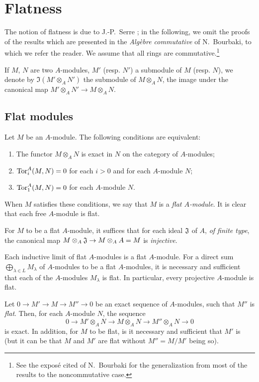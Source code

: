 \section{Flatness}
\label{section:0.6}

\begin{env}[6.0]
\label{0.6.0.0}
The notion of flatness is due to J.-P.~Serre \cite{I-16}; in the following, we omit the
proofs of the results which are presented in the \emph{Alg\`ebre commutative} of N.~Bourbaki,
to which we refer the reader. We assume that all rings are commutative.\footnote{See the
expos\'e cited of N.~Bourbaki for the generalization from most of the results to the
noncommutative case.}

If $M$, $N$ are two $A$-modules, $M'$ (resp. $N'$) a submodule of $M$ (resp. $N$), we denote
by $\Im(M'\otimes_A N')$ the submodule of $M\otimes_A N$, the image under the canonical map
$M'\otimes_A N'\to M\otimes_A N$.
\end{env}

\subsection{Flat modules}
\label{subsection:0.6.1}

\begin{env}[6.1.1]
\label{0.6.1.1}
Let $M$ be an $A$-module. The following conditions are equivalent:
\begin{enumerate}[label=(\alph*)]
  \item The functor $M\otimes_A N$ is exact in $N$ on the category of $A$-modules;
  \item ${\mathop{\mathrm{Tor}}\nolimits}_i^A(M,N)=0$ for each $i>0$ and for each $A$-module $N$;
  \item ${\mathop{\mathrm{Tor}}\nolimits}_1^A(M,N)=0$ for each $A$-module $N$.
\end{enumerate}

When $M$ satisfies these conditions, we say that $M$ is a
\emph{flat $A$-module}. It is clear that each free $A$-module is flat.

For $M$ to be a flat $A$-module, it suffices that for each ideal $\mathfrak{J}$
of $A$, \emph{of finite type}, the canonical map
$M\otimes_A\fk{J}\to M\otimes_A A=M$ is \emph{injective}.
\end{env}

\begin{env}[6.1.2]
\label{0.6.1.2}
Each inductive limit of flat $A$-modules is a flat $A$-module. For a direct sum
$\bigoplus_{\lambda\in L}M_\lambda$ of $A$-modules to be a flat $A$-modules, it
is necessary and sufficient that each of the $A$-modules $M_\lambda$ is flat. In
particular, every projective $A$-module is flat.

Let $0\to M'\to M\to M''\to 0$ be an exact sequence of $A$-modules, such that
$M''$ is \emph{flat}. Then, for each $A$-module $N$, the sequence
\[
  0\to M'\otimes_A N\to M\otimes_A N\to M''\otimes_A N\to 0
\]
is exact.
In addition, for $M$ to be flat, is it necessary and sufficient that $M'$ is (but it can be that $M$ and $M'$ are flat without $M''=M/M'$ being so).
\end{env}


